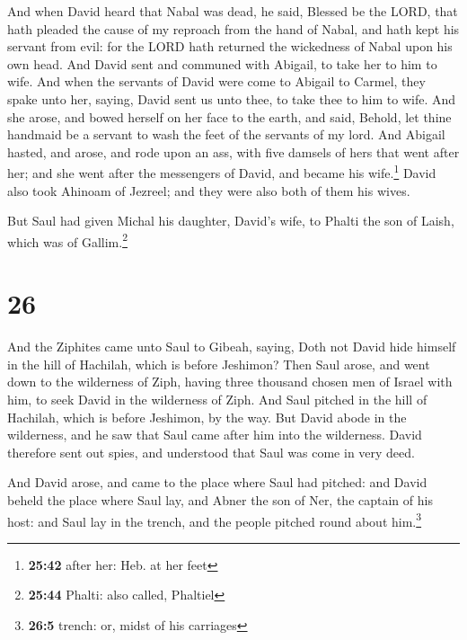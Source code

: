  And when David heard that Nabal was dead, he said,
Blessed be the LORD, that hath pleaded the cause of my reproach from the
hand of Nabal, and hath kept his servant from evil: for the LORD hath
returned the wickedness of Nabal upon his own head. And David sent and
communed with Abigail, to take her to him to wife.  And
when the servants of David were come to Abigail to Carmel, they spake
unto her, saying, David sent us unto thee, to take thee to him to wife.
 And she arose, and bowed herself on her face to the
earth, and said, Behold, let thine handmaid be a servant to wash the
feet of the servants of my lord.  And Abigail hasted, and
arose, and rode upon an ass, with five damsels of hers that went after
her; and she went after the messengers of David, and became his
wife.\footnote{\textbf{25:42} after her: Heb. at her feet}
 David also took Ahinoam of Jezreel; and they were also
both of them his wives.

 But Saul had given Michal his daughter, David's wife, to
Phalti the son of Laish, which was of Gallim.\footnote{\textbf{25:44}
  Phalti: also called, Phaltiel}

\hypertarget{section-25}{%
\section{26}\label{section-25}}

 And the Ziphites came unto Saul to Gibeah, saying, Doth
not David hide himself in the hill of Hachilah, which is before
Jeshimon?  Then Saul arose, and went down to the
wilderness of Ziph, having three thousand chosen men of Israel with him,
to seek David in the wilderness of Ziph.  And Saul pitched
in the hill of Hachilah, which is before Jeshimon, by the way. But David
abode in the wilderness, and he saw that Saul came after him into the
wilderness.  David therefore sent out spies, and
understood that Saul was come in very deed.

 And David arose, and came to the place where Saul had
pitched: and David beheld the place where Saul lay, and Abner the son of
Ner, the captain of his host: and Saul lay in the trench, and the people
pitched round about him.\footnote{\textbf{26:5} trench: or, midst of his
  carriages}

